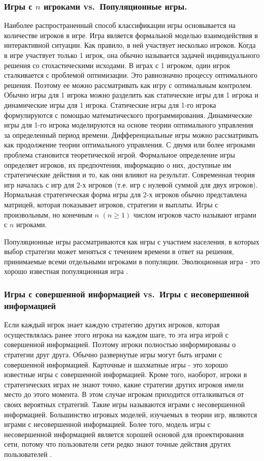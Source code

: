 \subsubsection{Игры с $n$ игроками vs.~Популяционные игры.}

Наиболее распространенный способ классификации игры основывается на
количестве игроков в игре. Игра является формальной моделью
взаимодействия в интерактивной ситуации. Как правило, в ней участвует
несколько игроков. Когда в игре участвует только 1 игрок, она обычно
называется задачей индивидуального решения со стохастическими исходами.
В играх с 1 игроком, один игрок сталкивается с проблемой оптимизации.
Это равнозначно процессу оптимального решения. Поэтому ее можно
рассматривать как игру с оптимальным контролем. Обычно игры для 1 игрока
можно разделить как статические игры для 1 игрока и динамические игры
для 1 игрока. Статические игры для 1-го игрока формулируются с помощью
математического программирования. Динамические игры для 1-го игрока
моделируются на основе теории оптимального управления за определенный
период времени. Дифференциальные игры можно рассматривать как
продолжение теории оптимального управления. С двумя или более игроками
проблема становится теоретической игрой. Формальное определение игры
определяет игроков, их предпочтения, информацию о них, доступные им
стратегические действия и то, как они влияют на результат. Современная
теория игр началась с игр для 2-х игроков (т.е. игр с нулевой суммой для
двух игроков). Нормальная стратегическая форма игры для 2-х игроков
обычно представлена матрицей, которая показывает игроков, стратегии и
выплаты. Игры с произвольным, но конечным \(n\) \((n \ge 1)\) числом
игроков часто называют играми с \(n\) игроками.

Популяционные игры рассматриваются как игры с участием населения, в
которых выбор стратегии может меняться с течением времени в ответ на
решения, принимаемые всеми отдельными игроками в популяции. Эволюционная
игра - это хорошо известная популяционная игра \cite{Sandholm:2007}.

\subsubsection{Игры с совершенной информацией vs.~Игры с несовершенной
информацией}

Если каждый игрок знает каждую стратегию других игроков, которая
осуществлялась ранее этого игрока на каждом шаге, то эта игра игрой с
совершенной информацией. Поэтому игроки полностью информированы о
стратегии друг друга. Обычно развернутые игры могут быть играми с
совершенной информацией. Карточные и шахматные игры - это хорошо
известные игры с совершенной информацией. Кроме того, наоборот, игроки в
стратегических играх не знают точно, какие стратегии других игроков
имели место до этого момента. В этом случае игрокам приходится
отталкиваться от своих вероятных стратегий. Такие игры называются играми
с несовершенной информацией. Большинство игровых моделей, изучаемых в
теории игр, являются играми с несовершенной информацией. Более того,
модель игры с несовершенной информацией является хорошей основой для
проектирования сети, потому что пользователи сети редко знают точные
действия других пользователей \cite{Leino:2003}.

